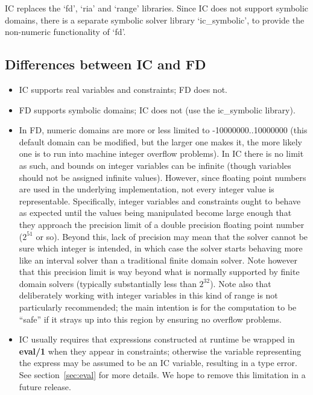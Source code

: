 IC replaces the `fd', `ria' and `range' libraries.  Since IC does not
support symbolic domains, there is a separate symbolic solver library
`ic_symbolic', to provide the non-numeric functionality of `fd'.


\subsection{Differences between IC and FD}

\begin{itemize}
\item   IC supports real variables and constraints; FD does not.

\item   FD supports symbolic domains; IC does not (use the ic_symbolic
        library).

\item   In FD, numeric domains are more or less limited to
        -10000000..10000000 (this default domain can be modified, but the
        larger one makes it, the more likely one is to run into machine
        integer overflow problems).  In IC there is no limit as such, and
        bounds on integer variables can be infinite (though variables should
        not be assigned infinite values).  However, since floating point
        numbers are used in the underlying implementation, not every integer
        value is representable.  Specifically, integer variables and
        constraints ought to behave as expected until the values being
        manipulated become large enough that they approach the precision
        limit of a double precision floating point number ($2^{51}$ or so).
        Beyond this, lack of precision may mean that the solver cannot be
        sure which integer is intended, in which case the solver starts
        behaving more like an interval solver than a traditional finite
        domain solver.  Note however that this precision limit is way beyond
        what is normally supported by finite domain solvers (typically
        substantially less than $2^{32}$).  Note also that deliberately
        working with integer variables in this kind of range is not
        particularly recommended; the main intention is for the computation
        to be ``safe'' if it strays up into this region by ensuring no
        overflow problems.

\item   IC usually requires that expressions constructed at runtime be
        wrapped in {\bf eval/1} when they appear in constraints; otherwise
        the variable representing the express may be assumed to be an IC
        variable, resulting in a type error. See section~\ref{sec:eval} for
        more details.  We hope to remove this limitation in a future release.


\end{itemize}
